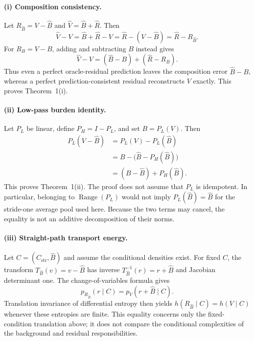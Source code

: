 \documentclass[letterpaper]{article}
\begin{document}
\paragraph{(i) Composition consistency.}
Let $R_{\hat B}=V-\hat B$ and $\hat V=\hat B+\hat R$. Then
\begin{equation}
\hat V-V=\hat B+\hat R-V=\hat R-(V-\hat B)=\hat R-R_{\hat B}.
\end{equation}
For $R_B=V-B$, adding and subtracting $B$ instead gives
\begin{equation}
\hat V-V=(\hat B-B)+(\hat R-R_B).
\end{equation}
Thus even a perfect oracle-residual prediction leaves the composition error $\hat B-B$, whereas a perfect prediction-consistent residual reconstructs $V$ exactly. This proves Theorem~1(i).

\paragraph{(ii) Low-pass burden identity.}
Let $P_L$ be linear, define $P_H=I-P_L$, and set $B=P_L(V)$. Then
\begin{align}
P_L(V-\hat B)
&=P_L(V)-P_L(\hat B)\\
&=B-\bigl(\hat B-P_H(\hat B)\bigr)\\
&=(B-\hat B)+P_H(\hat B).
\end{align}
This proves Theorem~1(ii). The proof does not assume that $P_L$ is idempotent. In particular, belonging to $\operatorname{Range}(P_L)$ would not imply $P_L(\hat B)=\hat B$ for the stride-one average pool used here. Because the two terms may cancel, the equality is not an additive decomposition of their norms.

\paragraph{(iii) Straight-path transport energy.}
Let $C=(C_{\mathrm{str}},\hat B)$ and assume the conditional densities exist. For fixed $C$, the transform $T_{\hat B}(v)=v-\hat B$ has inverse $T_{\hat B}^{-1}(r)=r+\hat B$ and Jacobian determinant one. The change-of-variables formula gives
\begin{equation}
p_{R_{\hat B}}(r\mid C)=p_V(r+\hat B\mid C).
\end{equation}
Translation invariance of differential entropy then yields $h(R_{\hat B}\mid C)=h(V\mid C)$ whenever these entropies are finite.
This equality concerns only the fixed-condition translation above; it does not compare the conditional complexities of the background and residual responsibilities.
\end{document}
